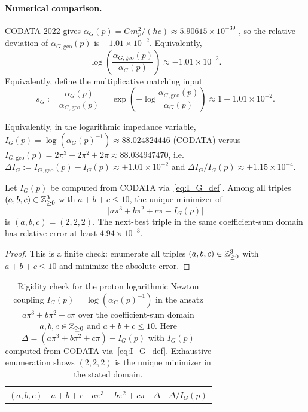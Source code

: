 \paragraph{Numerical comparison.}
CODATA 2022 gives $\alpha_G(p)=Gm_p^2/(\hbar c)\approx 5.90615\times 10^{-39}$ \cite{CODATA2022RMP}, so the relative deviation of $\alpha_{G,\mathrm{geo}}(p)$ is $-1.01\times 10^{-2}$.
Equivalently,
\begin{equation}
\log\!\left(\frac{\alpha_{G,\mathrm{geo}}(p)}{\alpha_G(p)}\right)\approx -1.01\times 10^{-2}.
\end{equation}
Equivalently, define the multiplicative matching input
\begin{equation}
s_G:=\frac{\alpha_G(p)}{\alpha_{G,\mathrm{geo}}(p)}=\exp\!\left(-\log\!\frac{\alpha_{G,\mathrm{geo}}(p)}{\alpha_G(p)}\right)\approx 1+1.01\times 10^{-2}.
\end{equation}

Equivalently, in the logarithmic impedance variable, $I_G(p)=\log(\alpha_G(p)^{-1})\approx 88.024824446$ (CODATA) versus $I_{G,\mathrm{geo}}(p)=2\pi^3+2\pi^2+2\pi\approx 88.034947470$, i.e.\ $\Delta I_G:=I_{G,\mathrm{geo}}(p)-I_G(p)\approx +1.01\times 10^{-2}$ and $\Delta I_G/I_G(p)\approx +1.15\times 10^{-4}$.

\begin{proposition}\label{prop:alpha_G_rigidity}
Let $I_G(p)$ be computed from CODATA via~\eqref{eq:I_G_def}. Among all triples $(a,b,c)\in\mathbb{Z}_{\ge 0}^3$ with $a+b+c\le 10$, the unique minimizer of
\begin{equation}
\big|a\pi^3+b\pi^2+c\pi-I_G(p)\big|
\end{equation}
is $(a,b,c)=(2,2,2)$. The next-best triple in the same coefficient-sum domain has relative error at least $4.94\times 10^{-3}$.
\end{proposition}
\begin{proof}
This is a finite check: enumerate all triples $(a,b,c)\in\mathbb{Z}_{\ge 0}^3$ with $a+b+c\le 10$ and minimize the absolute error.
\end{proof}

\begin{table}[t]
\centering
\begin{tabular}{@{}rrrrr@{}}
\toprule
$(a,b,c)$ & $a{+}b{+}c$ & $a\pi^3+b\pi^2+c\pi$ & $\Delta$ & $\Delta/I_G(p)$ \\
\midrule
%
\\
\bottomrule
\end{tabular}
\caption{Rigidity check for the proton logarithmic Newton coupling $I_G(p)=\log(\alpha_G(p)^{-1})$ in the ansatz $a\pi^3+b\pi^2+c\pi$ over the coefficient-sum domain $a,b,c\in\mathbb{Z}_{\ge 0}$ and $a+b+c\le 10$. Here $\Delta=(a\pi^3+b\pi^2+c\pi)-I_G(p)$ with $I_G(p)$ computed from CODATA via~\eqref{eq:I_G_def}. Exhaustive enumeration shows $(2,2,2)$ is the unique minimizer in the stated domain.}
\label{tab:alpha_G_integer_search}
\end{table}
